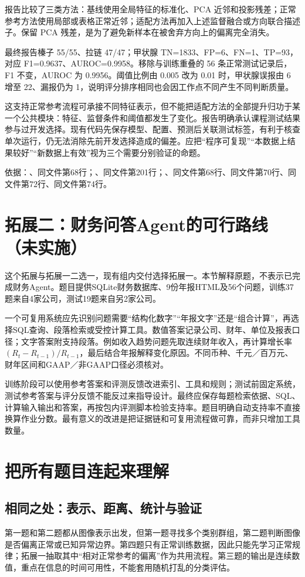 \documentclass[UTF8,fontset=windows,11pt,a4paper]{ctexart}
\begin{document}
报告比较了三类方法：基线使用全局特征的标准化、PCA 近邻和投影残差；正常参考方法使用局部或表格正常近邻；适配方法再加入上述监督融合或方向联合描述子。保留 PCA 残差，是为了避免新样本在被舍弃方向上的偏离完全消失。

最终报告榛子 55/55、拉链 47/47；甲状腺 TN=1833、FP=6、FN=1、TP=93，对应 F1=0.9637、AUROC=0.9958。移除与训练重叠的 56 条正常测试记录后，F1 不变，AUROC 为 0.9956。阈值比例由 0.005 改为 0.01 时，甲状腺误报由 6 增至 22、漏报仍为 1，说明评分排序相同也会因工作点不同产生不同判断质量。

这支持正常参考流程可承接不同特征表示，但不能把适配方法的全部提升归功于某一个公共模块：特征、监督条件和阈值都发生了变化。报告明确承认课程测试结果参与过开发选择。现有代码先保存模型、配置、预测后关联测试标签，有利于核查单次运行，仍无法消除先前开发选择造成的偏差。应把“程序可复现”“本数据上结果较好”“新数据上有效”视为三个需要分别验证的命题。

依据：、同文件第68行；、同文件第201行；、同文件第68行、同文件第70行、同文件第72行、同文件第74行。
\section{拓展二：财务问答Agent的可行路线（未实施）}
这个拓展与拓展一二选一，现有组内交付选择拓展一。本节解释原题，不表示已完成财务Agent。题目提供SQLite财务数据库、9份年报HTML及56个问题，训练37题来自4家公司，测试19题来自另2家公司。

一个可复用系统应先识别问题需要“结构化数字”“年报文字”还是“组合计算”，再选择SQL查询、段落检索或受控计算工具。数值答案记录公司、财年、单位及报表口径；文字答案附支持段落。例如收入趋势问题先取连续财年收入，再计算增长率$(R_t-R_{t-1})/R_{t-1}$，最后结合年报解释变化原因。不同币种、千元／百万元、财年区间和GAAP／非GAAP口径必须核对。

训练阶段可以使用参考答案和评测反馈改进索引、工具和规则；测试前固定系统，测试参考答案与评分反馈不能反过来指导设计。最终应保存每题检索依据、SQL、计算输入输出和答案，再按包内评测脚本检验支持率。题目明确自动支持率不直接换算作业分数。最有意义的改进是把证据链和可复用流程做可靠，而非只增加工具数量。

\section{把所有题目连起来理解}
\subsection{相同之处：表示、距离、统计与验证}
第一题和第二题都从图像表示出发，但第一题寻找多个类别群组，第二题判断图像是否偏离正常或已知异常边界。第四题只有正常训练数据，因此只能先学习正常规律；拓展一抽取其中“相对正常参考的偏离”作为共用流程。第三题的输出是连续数值，重点在信息的时间可用性，不能套用随机打乱的分类评估。
\end{document}
